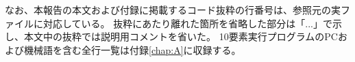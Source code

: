 \par\medskip\noindent\begin{minipage}{\linewidth}
\par\medskip{}\par\nopagebreak

\end{minipage}\par\medskip

なお、本報告の本文および付録に掲載するコード抜粋の行番号は、参照元の実ファイルに対応している。
抜粋にあたり離れた箇所を省略した部分は「...」で示し、本文中の抜粋では説明用コメントを省いた。
10要素実行プログラムのPCおよび機械語を含む全行一覧は付録\ref{chap:A}に収録する。
